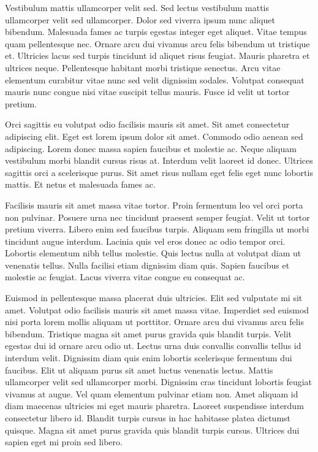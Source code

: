 \documentclass[11pt,a4paper]{article}
\begin{document}
Vestibulum mattis ullamcorper velit sed. Sed lectus vestibulum mattis ullamcorper velit sed ullamcorper. Dolor sed viverra ipsum nunc aliquet bibendum. Malesuada fames ac turpis egestas integer eget aliquet. Vitae tempus quam pellentesque nec. Ornare arcu dui vivamus arcu felis bibendum ut tristique et. Ultricies lacus sed turpis tincidunt id aliquet risus feugiat. Mauris pharetra et ultrices neque. Pellentesque habitant morbi tristique senectus. Arcu vitae elementum curabitur vitae nunc sed velit dignissim sodales. Volutpat consequat mauris nunc congue nisi vitae suscipit tellus mauris. Fusce id velit ut tortor pretium.

Orci sagittis eu volutpat odio facilisis mauris sit amet. Sit amet consectetur adipiscing elit. Eget est lorem ipsum dolor sit amet. Commodo odio aenean sed adipiscing. Lorem donec massa sapien faucibus et molestie ac. Neque aliquam vestibulum morbi blandit cursus risus at. Interdum velit laoreet id donec. Ultrices sagittis orci a scelerisque purus. Sit amet risus nullam eget felis eget nunc lobortis mattis. Et netus et malesuada fames ac.

Facilisis mauris sit amet massa vitae tortor. Proin fermentum leo vel orci porta non pulvinar. Posuere urna nec tincidunt praesent semper feugiat. Velit ut tortor pretium viverra. Libero enim sed faucibus turpis. Aliquam sem fringilla ut morbi tincidunt augue interdum. Lacinia quis vel eros donec ac odio tempor orci. Lobortis elementum nibh tellus molestie. Quis lectus nulla at volutpat diam ut venenatis tellus. Nulla facilisi etiam dignissim diam quis. Sapien faucibus et molestie ac feugiat. Lacus viverra vitae congue eu consequat ac.

Euismod in pellentesque massa placerat duis ultricies. Elit sed vulputate mi sit amet. Volutpat odio facilisis mauris sit amet massa vitae. Imperdiet sed euismod nisi porta lorem mollis aliquam ut porttitor. Ornare arcu dui vivamus arcu felis bibendum. Tristique magna sit amet purus gravida quis blandit turpis. Velit egestas dui id ornare arcu odio ut. Lectus urna duis convallis convallis tellus id interdum velit. Dignissim diam quis enim lobortis scelerisque fermentum dui faucibus. Elit ut aliquam purus sit amet luctus venenatis lectus. Mattis ullamcorper velit sed ullamcorper morbi. Dignissim cras tincidunt lobortis feugiat vivamus at augue. Vel quam elementum pulvinar etiam non. Amet aliquam id diam maecenas ultricies mi eget mauris pharetra. Laoreet suspendisse interdum consectetur libero id. Blandit turpis cursus in hac habitasse platea dictumst quisque. Magna sit amet purus gravida quis blandit turpis cursus. Ultrices dui sapien eget mi proin sed libero.
\end{document}
